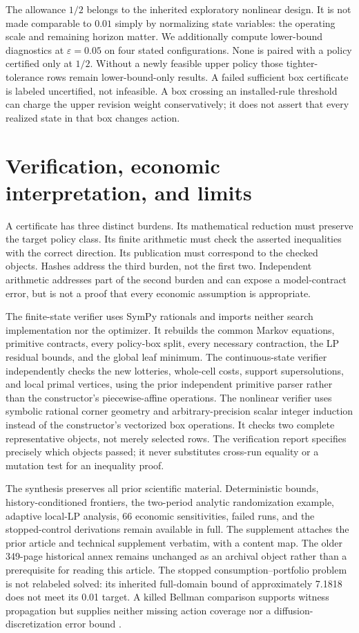 The allowance $1/2$ belongs to the inherited exploratory nonlinear design. It is not made comparable to $0.01$ simply by normalizing state variables: the operating scale and remaining horizon matter. We additionally compute lower-bound diagnostics at $\varepsilon=0.05$ on four stated configurations. None is paired with a policy certified only at $1/2$. Without a newly feasible upper policy those tighter-tolerance rows remain lower-bound-only results. A failed sufficient box certificate is labeled uncertified, not infeasible. A box crossing an installed-rule threshold can charge the upper revision weight conservatively; it does not assert that every realized state in that box changes action.

\section{Verification, economic interpretation, and limits}\label{sec:verification}
A certificate has three distinct burdens. Its mathematical reduction must preserve the target policy class. Its finite arithmetic must check the asserted inequalities with the correct direction. Its publication must correspond to the checked objects. Hashes address the third burden, not the first two. Independent arithmetic addresses part of the second burden and can expose a model-contract error, but is not a proof that every economic assumption is appropriate.

The finite-state verifier uses SymPy rationals and imports neither search implementation nor the optimizer. It rebuilds the common Markov equations, primitive contracts, every policy-box split, every necessary contraction, the LP residual bounds, and the global leaf minimum. The continuous-state verifier independently checks the new lotteries, whole-cell costs, support supersolutions, and local primal vertices, using the prior independent primitive parser rather than the constructor's piecewise-affine operations. The nonlinear verifier uses symbolic rational corner geometry and arbitrary-precision scalar integer induction instead of the constructor's vectorized box operations. It checks two complete representative objects, not merely selected rows. The verification report specifies precisely which objects passed; it never substitutes cross-run equality or a mutation test for an inequality proof.

The synthesis preserves all prior scientific material. Deterministic bounds, history-conditioned frontiers, the two-period analytic randomization example, adaptive local-LP analysis, 66 economic sensitivities, failed runs, and the stopped-control derivations remain available in full. The supplement attaches the prior article and technical supplement verbatim, with a content map. The older 349-page historical annex remains unchanged as an archival object rather than a prerequisite for reading this article. The stopped consumption--portfolio problem is not relabeled solved: its inherited full-domain bound of approximately 7.1818 does not meet its 0.01 target. A killed Bellman comparison supports witness propagation but supplies neither missing action coverage nor a diffusion-discretization error bound \citep{KushnerDupuis2001}.

